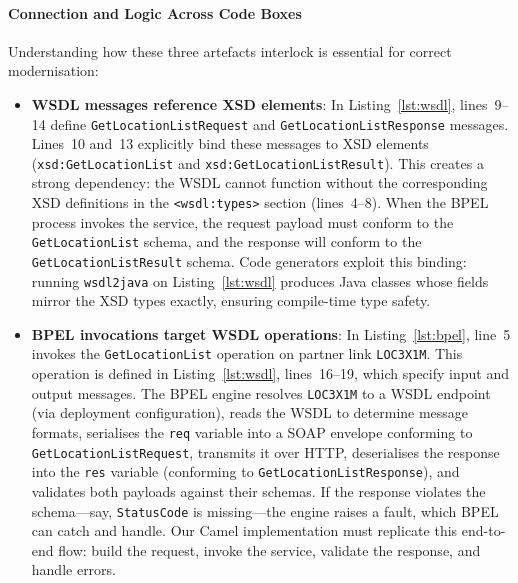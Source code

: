 \documentclass[11pt]{article}
\begin{document}
\paragraph{Connection and Logic Across Code Boxes}

Understanding how these three artefacts interlock is essential for correct modernisation:

\begin{itemize}
  \item \textbf{WSDL messages reference XSD elements}: In Listing~\ref{lst:wsdl}, lines~9--14 define \texttt{GetLocationListRequest} and \texttt{GetLocationListResponse} messages. Lines~10 and~13 explicitly bind these messages to XSD elements (\texttt{xsd:GetLocationList} and \texttt{xsd:GetLocationListResult}). This creates a strong dependency: the WSDL cannot function without the corresponding XSD definitions in the \texttt{<wsdl:types>} section (lines~4--8). When the BPEL process invokes the service, the request payload must conform to the \texttt{GetLocationList} schema, and the response will conform to the \texttt{GetLocationListResult} schema. Code generators exploit this binding: running \texttt{wsdl2java} on Listing~\ref{lst:wsdl} produces Java classes whose fields mirror the XSD types exactly, ensuring compile-time type safety.

  \item \textbf{BPEL invocations target WSDL operations}: In Listing~\ref{lst:bpel}, line~5 invokes the \texttt{GetLocationList} operation on partner link \texttt{LOC3X1M}. This operation is defined in Listing~\ref{lst:wsdl}, lines~16--19, which specify input and output messages. The BPEL engine resolves \texttt{LOC3X1M} to a WSDL endpoint (via deployment configuration), reads the WSDL to determine message formats, serialises the \texttt{req} variable into a SOAP envelope conforming to \texttt{GetLocationListRequest}, transmits it over HTTP, deserialises the response into the \texttt{res} variable (conforming to \texttt{GetLocationListResponse}), and validates both payloads against their schemas. If the response violates the schema—say, \texttt{StatusCode} is missing—the engine raises a fault, which BPEL can catch and handle. Our Camel implementation must replicate this end-to-end flow: build the request, invoke the service, validate the response, and handle errors.

  \vspace{0.5em}
  \noindent{}
  \vspace{0.5em}


\end{itemize}
\end{document}
